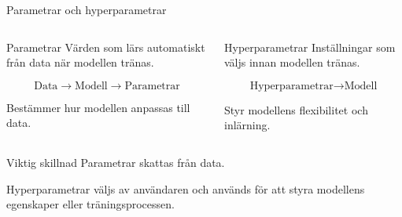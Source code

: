 \documentclass[10pt,english]{beamer}
\begin{document}
\begin{frame}{Parametrar och hyperparametrar}

\begin{columns}


\begin{block}{Parametrar}
Värden som lärs automatiskt från data när modellen tränas.

\vspace{0.3cm}

\[
\text{Data}
\longrightarrow
\text{Modell}
\longrightarrow
\text{Parametrar}
\]

\vspace{0.3cm}

Bestämmer hur modellen anpassas till data.

\end{block}


\begin{block}{Hyperparametrar}
Inställningar som väljs innan modellen tränas.

\vspace{0.3cm}

\[
\text{Hyperparametrar}
\longrightarrow
\text{Modell}
\]

\vspace{0.3cm}

Styr modellens flexibilitet och inlärning.

\end{block}

\end{columns}

\vspace{0.4cm}

\begin{alertblock}{Viktig skillnad}
Parametrar skattas från data.

Hyperparametrar väljs av användaren och används för att styra modellens egenskaper eller träningsprocessen.
\end{alertblock}

\end{frame}
\end{document}
